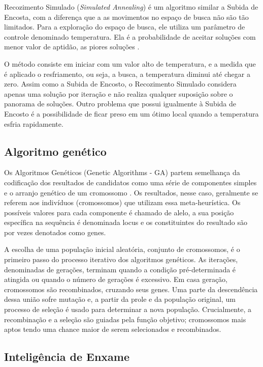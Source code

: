 Recozimento Simulado (\textit{Simulated Annealing}) é um algoritmo similar a Subida de Encosta, com a diferença que a as movimentos no espaço de busca não são tão limitados. Para a exploração do espaço de busca, ele utiliza um parâmetro de controle denominado temperatura. Ela é a probabilidade de aceitar soluções com menor valor de aptidão, as piores soluções \cite{kirkpatrick1983optimization}.

O método consiste em iniciar com um valor alto de temperatura, e a medida que é aplicado o resfriamento, ou seja, a busca, a temperatura diminui até chegar a zero. Assim como a Subida de Encosto, o Recozimento Simulado considera apenas uma solução por iteração e não realiza qualquer suposição sobre o panorama de soluções. Outro problema que possui igualmente à Subida de Encosto é a possibilidade de ficar preso em um ótimo local quando a temperatura esfria rapidamente.

\subsection{Algoritmo genético}

Os Algoritmos Genéticos (Genetic Algorithms - GA) partem semelhança da codificação dos resultados de candidatos como uma série de componentes simples e o arranjo genético de um cromossomo \cite{alander1998genetic}. Os resultados, nesse caso, geralmente se referem aos indivíduos (cromossomos) que utilizam essa meta-heurística. Os possíveis valores para cada componente é chamado de alelo, a sua posição específica na sequência é denominada locus e os constituintes do resultado são por vezes denotados como genes.

A escolha de uma população inicial aleatória, conjunto de cromossomos, é o primeiro passo do processo iterativo dos algoritmos genéticos. As iterações, denominadas de gerações, terminam quando a condição pré-determinada é atingida ou quando o número de gerações é excessivo. Em casa geração, cromossomos são recombinados, cruzando seus genes. Uma parte da descendência dessa união sofre mutação e, a partir da prole e da população original, um processo de seleção é usado para determinar a nova população. Crucialmente, a recombinação e a seleção são guiadas pela função objetivo; cromossomos mais aptos tendo uma chance maior de serem selecionados e recombinados.

\subsection{Inteligência de Enxame}

